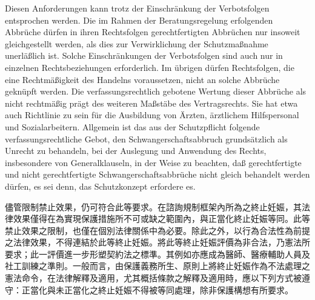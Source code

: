 \documentclass[12pt]{article}
\begin{document}
\begin{sourcepara}[title={原文D.105}]
Diesen Anforderungen kann trotz der Einschränkung der Verbotsfolgen entsprochen werden. Die im Rahmen der Beratungsregelung erfolgenden Abbrüche dürfen in ihren Rechtsfolgen gerechtfertigten Abbrüchen nur insoweit gleichgestellt werden, als dies zur Verwirklichung der Schutzmaßnahme unerläßlich ist. Solche Einschränkungen der Verbotsfolgen sind auch nur in einzelnen Rechtsbeziehungen erforderlich. Im übrigen dürfen Rechtsfolgen, die eine Rechtmäßigkeit des Handelns voraussetzen, nicht an solche Abbrüche geknüpft werden. Die verfassungsrechtlich gebotene Wertung dieser Abbrüche als nicht rechtmäßig prägt des weiteren Maßstäbe des Vertragsrechts. Sie hat etwa auch Richtlinie zu sein für die Ausbildung von Ärzten, ärztlichem Hilfspersonal und Sozialarbeitern. Allgemein ist das aus der Schutzpflicht folgende verfassungsrechtliche Gebot, den Schwangerschaftsabbruch grundsätzlich als Unrecht zu behandeln, bei der Auslegung und Anwendung des Rechts, insbesondere von Generalklauseln, in der Weise zu beachten, daß gerechtfertigte und nicht gerechtfertigte Schwangerschaftsabbrüche nicht gleich behandelt werden dürfen, es sei denn, das Schutzkonzept erfordere es.
\end{sourcepara}
\begin{transpara}
儘管限制禁止效果，仍可符合此等要求。在諮詢規制框架內所為之終止妊娠，其法律效果僅得在為實現保護措施所不可或缺之範圍內，與正當化終止妊娠等同。此等禁止效果之限制，也僅在個別法律關係中為必要。除此之外，以行為合法性為前提之法律效果，不得連結於此等終止妊娠。將此等終止妊娠評價為非合法，乃憲法所要求；此一評價進一步形塑契約法之標準。其例如亦應成為醫師、醫療輔助人員及社工訓練之準則。一般而言，由保護義務所生、原則上將終止妊娠作為不法處理之憲法命令，在法律解釋及適用，尤其概括條款之解釋及適用時，應以下列方式被遵守：正當化與未正當化之終止妊娠不得被等同處理，除非保護構想有所要求。
\end{transpara}
\end{document}
